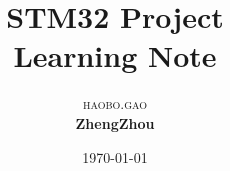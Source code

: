 \documentclass [a4paper,8pt,oneside] {report}
\begin{document}
\title{\textbf{STM32 Project}\\ %
 Learning Note} %

\author{\textsc{haobo.gao} %
\\{\textbf{ZhengZhou}}
} %

\date{\today} %
\maketitle


\tableofcontents
\newpage
{}




\end{document}
